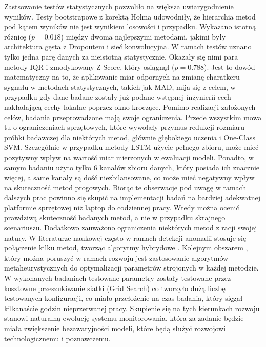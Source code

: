 \documentclass[a4paper,twoside,12pt]{book}
\begin{document}
	Zastsowanie testów statystycznych pozwoliło na większa uwiarygodnienie wyników. Testy bootstrapowe z korektą Holma udowodniły, że hierarchia metod pod kątem wyników nie jest wynikiem losowości i przypadku. Wykazano istotną różnicę ($p = 0.018$) między dwoma najlepszymi metodami, jakimi były architektura gęsta z  Dropoutem i sieć konwolucyjna. W ramach testów uznano tylko jedna parę danych za nieistotną statystycznie. Okazały się nimi para metody IQR i zmodykowany Z-Score, który osiągnął ($p = 0.788$). Jest to dowód matematyczny na to, że aplikowanie miar odpornych na zmianę charatkeru sygnału w metodach statystycznych, takich jak MAD, mija się z celem, w przypadku gdy dane badane zostały już podane wstępnej inżynierii cech nakładającą cechy lokalne poprzez okno kroczące. 
	Pomimo realizacji założonych celów, badania przeprowadzone mają swoje ograniczenia. Przede wszystkim mowa tu o ograniczeniach sprzętowych, które wywołały przymus redukcji rozmiaru próbki badawczej dla niektórych metod, głównie głębokiego uczenia i One-Class SVM. Szczególnie w przypadku metody LSTM użycie pełnego zbioru, może mieć pozytywny wpływ na wartość miar mierzonych w ewaluacji modeli. Ponadto, w samym badaniu użyto tylko 6 kanałów zbioru danych, który posiada ich znacznie więcej, a same kanały są dość niezbilansowane, co może mieć negatywny wpływ na skuteczność metod progowych. Biorąc te obserwacje pod uwagę w ramach dalszych prac powinno się skupić na implementacji badań na bardziej adekwatnej platformie sprzętowej niż laptop do codziennej pracy. Wtedy można ocenić prawdziwą skuteczność badanych metod, a nie w przypadku skrajnego scenariuszu. Dodatkowo zauważono ograniczenia niektórych metod z racji swojej natury. W literaturze naukowej często w ramach detekcji anomalii stosuje się połączenie kilku metod, tworząc algorytmy hybrydowe \cite{ rana2022hybrid}. Kolejnym obszarem , który można poruszyć w ramach rozwoju jest zastosowanie algorytmów metaheurystycznych do optymalizacji parametrów strojonych w każdej metodzie. W wykonanych badaniach testowane parametry zostały testowane przez kosztowne przeszukiwanie siatki (Grid Search) co tworzyło dużą liczbę testowanych konfiguracji, co miało przełożenie na czas badania, który sięgał kilkanaście godzin nieprzerwanej pracy. Skupienie się na tych kierunkach rozwoju stanowi naturalną ewolucję systemu monitorowania, która za zadanie będzie miała zwiększenie bezawaryjności modeli, które będą służyć rozwojowi technologicznemu i poznawczemu.

	
	\cleardoublepage
	\printbibliography           %
	
\end{document}
